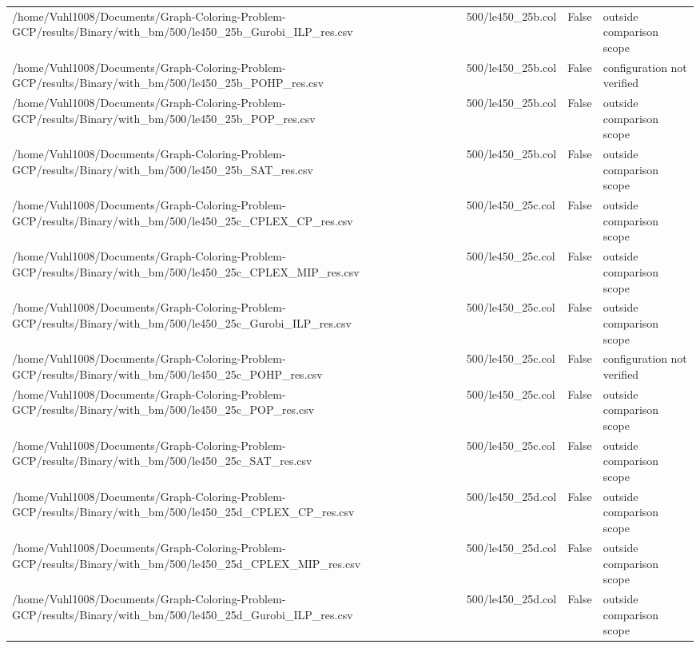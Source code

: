 \begin{table}[htbp]
\begin{tabular}{llll}
/home/Vuhl1008/Documents/Graph-Coloring-Problem-GCP/results/Binary/with\_bm/500/le450\_25b\_Gurobi\_ILP\_res.csv & 500/le450\_25b.col & False & outside comparison scope \\
/home/Vuhl1008/Documents/Graph-Coloring-Problem-GCP/results/Binary/with\_bm/500/le450\_25b\_POHP\_res.csv & 500/le450\_25b.col & False & configuration not verified \\
/home/Vuhl1008/Documents/Graph-Coloring-Problem-GCP/results/Binary/with\_bm/500/le450\_25b\_POP\_res.csv & 500/le450\_25b.col & False & outside comparison scope \\
/home/Vuhl1008/Documents/Graph-Coloring-Problem-GCP/results/Binary/with\_bm/500/le450\_25b\_SAT\_res.csv & 500/le450\_25b.col & False & outside comparison scope \\
/home/Vuhl1008/Documents/Graph-Coloring-Problem-GCP/results/Binary/with\_bm/500/le450\_25c\_CPLEX\_CP\_res.csv & 500/le450\_25c.col & False & outside comparison scope \\
/home/Vuhl1008/Documents/Graph-Coloring-Problem-GCP/results/Binary/with\_bm/500/le450\_25c\_CPLEX\_MIP\_res.csv & 500/le450\_25c.col & False & outside comparison scope \\
/home/Vuhl1008/Documents/Graph-Coloring-Problem-GCP/results/Binary/with\_bm/500/le450\_25c\_Gurobi\_ILP\_res.csv & 500/le450\_25c.col & False & outside comparison scope \\
/home/Vuhl1008/Documents/Graph-Coloring-Problem-GCP/results/Binary/with\_bm/500/le450\_25c\_POHP\_res.csv & 500/le450\_25c.col & False & configuration not verified \\
/home/Vuhl1008/Documents/Graph-Coloring-Problem-GCP/results/Binary/with\_bm/500/le450\_25c\_POP\_res.csv & 500/le450\_25c.col & False & outside comparison scope \\
/home/Vuhl1008/Documents/Graph-Coloring-Problem-GCP/results/Binary/with\_bm/500/le450\_25c\_SAT\_res.csv & 500/le450\_25c.col & False & outside comparison scope \\
/home/Vuhl1008/Documents/Graph-Coloring-Problem-GCP/results/Binary/with\_bm/500/le450\_25d\_CPLEX\_CP\_res.csv & 500/le450\_25d.col & False & outside comparison scope \\
/home/Vuhl1008/Documents/Graph-Coloring-Problem-GCP/results/Binary/with\_bm/500/le450\_25d\_CPLEX\_MIP\_res.csv & 500/le450\_25d.col & False & outside comparison scope \\
/home/Vuhl1008/Documents/Graph-Coloring-Problem-GCP/results/Binary/with\_bm/500/le450\_25d\_Gurobi\_ILP\_res.csv & 500/le450\_25d.col & False & outside comparison scope \\

\end{tabular}
\end{table}

